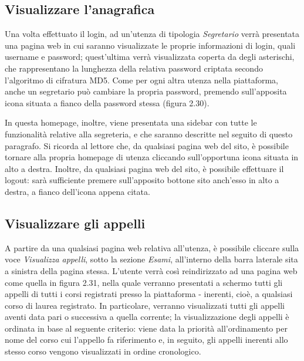 \documentclass [a4paper,11pt]{book}
\begin{document}
\subsection{Visualizzare l'anagrafica}

Una volta effettuato il login, ad un'utenza di tipologia \emph{Segretario} verrà presentata una pagina web in cui saranno visualizzate le proprie informazioni di login, quali username e password; quest'ultima verrà visualizzata coperta da degli asterischi, che rappresentano la lunghezza della relativa password criptata secondo l'algoritmo di cifratura MD5. Come per ogni altra utenza nella piattaforma, anche un segretario può cambiare la propria password, premendo sull'apposita icona situata a fianco della password stessa (figura 2.30). 


In questa homepage, inoltre, viene presentata una sidebar con tutte le funzionalità relative alla segreteria, e che saranno descritte nel seguito di questo paragrafo. Si ricorda al lettore che, da qualsiasi pagina web del sito, è possibile tornare alla propria homepage di utenza cliccando sull'opportuna icona situata in alto a destra. Inoltre, da qualsiasi pagina web del sito, è possibile effettuare il logout: sarà sufficiente premere sull'apposito bottone sito anch'esso in alto a destra, a fianco dell'icona appena citata.

\medskip

\subsection{Visualizzare gli appelli}

A partire da una qualsiasi pagina web relativa all'utenza, è possibile cliccare sulla voce \emph{Visualizza appelli}, sotto la sezione \emph{Esami}, all'interno della barra laterale sita a sinistra della pagina stessa. L'utente verrà così reindirizzato ad una pagina web come quella in figura 2.31, nella quale verranno presentati a schermo tutti gli appelli di tutti i corsi registrati presso la piattaforma - inerenti, cioè, a qualsiasi corso di laurea registrato. In particolare, verranno visualizzati tutti gli appelli aventi data pari o successiva a quella corrente; la visualizzazione degli appelli è ordinata in base al seguente criterio: viene data la priorità all'ordinamento per nome del corso cui l'appello fa riferimento e, in seguito, gli appelli inerenti allo stesso corso vengono visualizzati in ordine cronologico.
\end{document}
